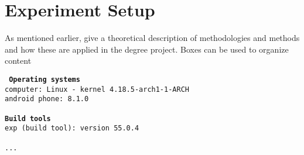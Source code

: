\section{Experiment Setup}




As mentioned earlier, give a theoretical description of methodologies and methods and how these are applied in the degree project.
Boxes can be used to organize content
\begin{tcolorbox}[title={Development environment for stochastic model}]
	\tt{
		\textbf{Operating systems }\\
		computer: Linux - kernel 4.18.5-arch1-1-ARCH\\
		android phone: 8.1.0\\
		~\\
		\textbf{Build tools}\\
		exp (build tool): version 55.0.4\\
		~\\
		...
	}
\end{tcolorbox}
